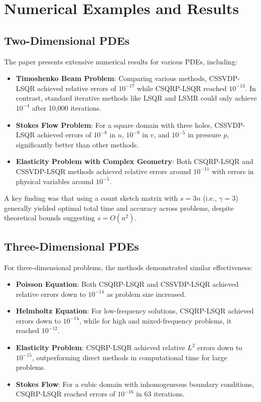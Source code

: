 \documentclass[11pt]{article}
\begin{document}
\section{Numerical Examples and Results}

\subsection{Two-Dimensional PDEs}

The paper presents extensive numerical results for various PDEs, including:

\begin{itemize}
    \item \textbf{Timoshenko Beam Problem}: Comparing various methods, CSSVDP-LSQR achieved relative errors of $10^{-17}$ while CSQRP-LSQR reached $10^{-13}$. In contrast, standard iterative methods like LSQR and LSMR could only achieve $10^{-4}$ after 10,000 iterations.
    
    \item \textbf{Stokes Flow Problem}: For a square domain with three holes, CSSVDP-LSQR achieved errors of $10^{-8}$ in $u$, $10^{-9}$ in $v$, and $10^{-5}$ in pressure $p$, significantly better than other methods.
    
    \item \textbf{Elasticity Problem with Complex Geometry}: Both CSQRP-LSQR and CSSVDP-LSQR methods achieved relative errors around $10^{-11}$ with errors in physical variables around $10^{-5}$.
\end{itemize}

A key finding was that using a count sketch matrix with $s = 3n$ (i.e., $\gamma = 3$) generally yielded optimal total time and accuracy across problems, despite theoretical bounds suggesting $s = O(n^2)$.

\subsection{Three-Dimensional PDEs}

For three-dimensional problems, the methods demonstrated similar effectiveness:

\begin{itemize}
    \item \textbf{Poisson Equation}: Both CSQRP-LSQR and CSSVDP-LSQR achieved relative errors down to $10^{-14}$ as problem size increased.
    
    \item \textbf{Helmholtz Equation}: For low-frequency solutions, CSQRP-LSQR achieved errors down to $10^{-14}$, while for high and mixed-frequency problems, it reached $10^{-12}$.
    
    \item \textbf{Elasticity Problem}: CSQRP-LSQR achieved relative $L^2$ errors down to $10^{-15}$, outperforming direct methods in computational time for large problems.
    
    \item \textbf{Stokes Flow}: For a cubic domain with inhomogeneous boundary conditions, CSQRP-LSQR reached errors of $10^{-16}$ in 63 iterations.
\end{itemize}
\end{document}
